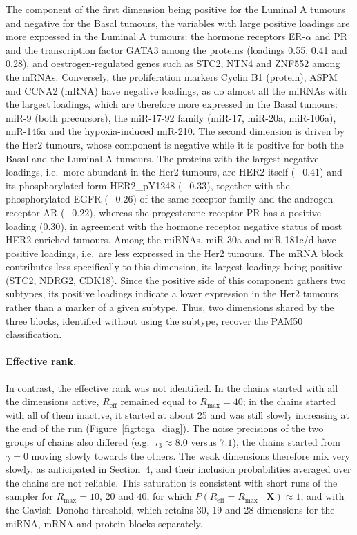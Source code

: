 \documentclass[11pt]{article}
\newcommand{\X}{\mathbf{X}}
\newcommand{\Reff}{R_{\mathrm{eff}}}
\begin{document}
The component of the first dimension being positive for the Luminal A tumours and negative for the Basal tumours, the variables with large positive loadings are more expressed in the Luminal A tumours: the hormone receptors ER-$\alpha$ and PR and the transcription factor GATA3 among the proteins (loadings 0.55, 0.41 and 0.28), and oestrogen-regulated genes such as STC2, NTN4 and ZNF552 among the mRNAs. Conversely, the proliferation markers Cyclin B1 (protein), ASPM and CCNA2 (mRNA) have negative loadings, as do almost all the miRNAs with the largest loadings, which are therefore more expressed in the Basal tumours: miR-9 (both precursors), the miR-17-92 family (miR-17, miR-20a, miR-106a), miR-146a and the hypoxia-induced miR-210. The second dimension is driven by the Her2 tumours, whose component is negative while it is positive for both the Basal and the Luminal A tumours. The proteins with the largest negative loadings, i.e.\ more abundant in the Her2 tumours, are HER2 itself ($-0.41$) and its phosphorylated form HER2\_pY1248 ($-0.33$), together with the phosphorylated EGFR ($-0.26$) of the same receptor family and the androgen receptor AR ($-0.22$), whereas the progesterone receptor PR has a positive loading ($0.30$), in agreement with the hormone receptor negative status of most HER2-enriched tumours. Among the miRNAs, miR-30a and miR-181c/d have positive loadings, i.e.\ are less expressed in the Her2 tumours. The mRNA block contributes less specifically to this dimension, its largest loadings being positive (STC2, NDRG2, CDK18). Since the positive side of this component gathers two subtypes, its positive loadings indicate a lower expression in the Her2 tumours rather than a marker of a given subtype. Thus, two dimensions shared by the three blocks, identified without using the subtype, recover the PAM50 classification.
 
\paragraph{Effective rank.} In contrast, the effective rank was not identified. In the chains started with all the dimensions active, $\Reff$ remained equal to $R_{\max}=40$; in the chains started with all of them inactive, it started at about 25 and was still slowly increasing at the end of the run (Figure~\ref{fig:tcga_diag}). The noise precisions of the two groups of chains also differed (e.g.\ $\tau_3\approx8.0$ versus $7.1$), the chains started from $\gamma=0$ moving slowly towards the others. The weak dimensions therefore mix very slowly, as anticipated in Section~4, and their inclusion probabilities averaged over the chains are not reliable. This saturation is consistent with short runs of the sampler for $R_{\max}=10$, $20$ and $40$, for which $P(\Reff=R_{\max}\mid\X)\approx1$, and with the Gavish--Donoho threshold, which retains 30, 19 and 28 dimensions for the miRNA, mRNA and protein blocks separately.
 
\end{document}
